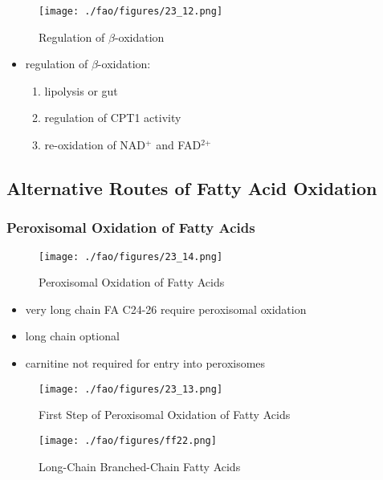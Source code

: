 \documentclass{scrartcl}
\begin{document}
\begin{figure}[htbp]
\centering
\texttt{[image: ./fao/figures/23\_12.png]}
\caption{\label{fig:org3fccf7e}
Regulation of \(\beta\)-oxidation}
\end{figure}

\begin{itemize}
\item regulation of \(\beta\)-oxidation:
\begin{enumerate}
\item lipolysis or gut
\item regulation of CPT1 activity
\item re-oxidation of NAD\(^{\text{+}}\) and FAD\(^{\text{2+}}\)
\end{enumerate}
\end{itemize}

\subsection{Alternative Routes of Fatty Acid Oxidation}
\label{sec:org690780f}
\subsubsection{Peroxisomal Oxidation of Fatty Acids}
\label{sec:org42ab871}

\begin{figure}[htbp]
\centering
\texttt{[image: ./fao/figures/23\_14.png]}
\caption{\label{fig:orgb8f6964}
Peroxisomal Oxidation of Fatty Acids}
\end{figure}

\begin{itemize}
\item very long chain FA C24-26 require peroxisomal oxidation
\item long chain optional
\item carnitine not required for entry into peroxisomes
\end{itemize}

\begin{figure}[htbp]
\centering
\texttt{[image: ./fao/figures/23\_13.png]}
\caption{\label{fig:org9076fc7}
First Step of Peroxisomal Oxidation of Fatty Acids}
\end{figure}

\begin{figure}[htbp]
\centering
\texttt{[image: ./fao/figures/ff22.png]}
\caption{\label{fig:org9c77de0}
Long-Chain Branched-Chain Fatty Acids}
\end{figure}
\end{document}
